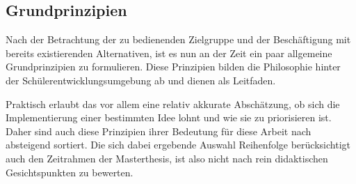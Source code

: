 \documentclass[paper=a4,fontsize=11pt,parskip=half]{scrartcl}
\begin{document}

\subsection{Grundprinzipien}
\label{sec:principles}

Nach der Betrachtung der zu bedienenden Zielgruppe und der Beschäftigung mit bereits existierenden Alternativen, ist es nun an der Zeit ein paar allgemeine Grundprinzipien zu formulieren. Diese Prinzipien bilden die Philosophie hinter der Schülerentwicklungsumgebung ab und dienen als Leitfaden.

Praktisch erlaubt das vor allem eine relativ akkurate Abschätzung, ob sich die Implementierung einer bestimmten Idee lohnt und wie sie zu priorisieren ist. Daher sind auch diese Prinzipien ihrer Bedeutung für diese Arbeit nach absteigend sortiert. Die sich dabei ergebende Auswahl Reihenfolge berücksichtigt auch den Zeitrahmen der Masterthesis, ist also nicht nach rein didaktischen Gesichtspunkten zu bewerten.
\end{document}
